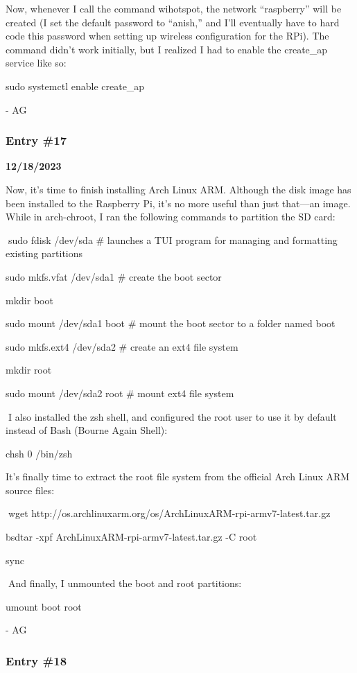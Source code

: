 Now, whenever I call the command wihotspot, the network ``raspberry''
will be created (I set the default password to ``anish,'' and I'll
eventually have to hard code this password when setting up wireless
configuration for the RPi). The command didn't work initially, but I
realized I had to enable the create\_ap service like so:

sudo systemctl enable create\_ap

- AG

\subsubsection{Entry \#17}\label{entry-17}

\textbf{12/18/2023}

Now, it's time to finish installing Arch Linux ARM. Although the disk
image has been installed to the Raspberry Pi, it's no more useful than
just that---an image. While in arch-chroot, I ran the following commands
to partition the SD card:

sudo fdisk /dev/sda \# launches a TUI program for managing and
formatting existing partitions

sudo mkfs.vfat /dev/sda1 \# create the boot sector

mkdir boot

sudo mount /dev/sda1 boot \# mount the boot sector to a folder named
boot

sudo mkfs.ext4 /dev/sda2 \# create an ext4 file system

mkdir root

sudo mount /dev/sda2 root \# mount ext4 file system

I also installed the zsh shell, and configured the root user to use it
by default instead of Bash (Bourne Again Shell):

chsh 0 /bin/zsh

It's finally time to extract the root file system from the official Arch
Linux ARM source files:

wget http://os.archlinuxarm.org/os/ArchLinuxARM-rpi-armv7-latest.tar.gz

bsdtar -xpf ArchLinuxARM-rpi-armv7-latest.tar.gz -C root

sync

And finally, I unmounted the boot and root partitions:

umount boot root

- AG

\subsubsection{Entry \#18}\label{entry-18}

